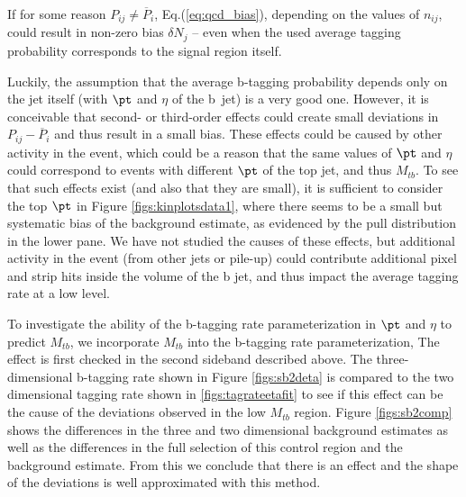 If for some reason $P_{ij} \neq \overline P_i$, 
Eq.(\ref{eq:qcd_bias}), depending on the values of $n_{ij}$, could
result in non-zero bias $\delta N_j$ -- even when the used 
average tagging probability
corresponds to the signal region itself.

Luckily, the assumption that the average b-tagging probability
depends only on the jet itself (with $\pt$ and $\eta$ of the b~jet)
is a very good one.  However, it is conceivable that second- or
third-order effects could create small deviations in 
$P_{ij} - \overline P_i$ and thus result in a small bias.
These effects could be caused by other activity in the event,
which could be a reason that the same values of $\pt$ and $\eta$ 
could correspond to events with different $\pt$ of the top jet,
and thus $M_{tb}$. To see that such effects exist (and also that
they are small), it is sufficient to consider the top $\pt$ in
Figure \ref{figs:kinplotsdata1}, where there seems to be a small but systematic bias of
the background estimate, as evidenced by the pull distribution
in the lower pane.  We have not studied the causes of these
effects, but additional activity in the event (from other
jets or pile-up) could contribute additional pixel and
strip hits inside the volume of the b jet, and thus impact
the average tagging rate at a low level.

To investigate the ability of the b-tagging rate parameterization in
$\pt$ and $\eta$ to predict $M_{tb}$, we incorporate $M_{tb}$ into the
b-tagging rate parameterization,  The effect is first checked in the
second sideband described above.  The three-dimensional b-tagging rate
shown in Figure \ref{figs:sb2deta} is compared to the two dimensional
tagging rate shown in \ref{figs:tagrateetafit} to see if this effect
can be the cause of the deviations observed in the low $M_{tb}$
region.  Figure \ref{figs:sb2comp} shows the differences in the three
and two dimensional background estimates as well as the differences in
the full selection of this control region and the background estimate.
From this we conclude that there is an effect and the shape of the
deviations is well approximated with this method.

